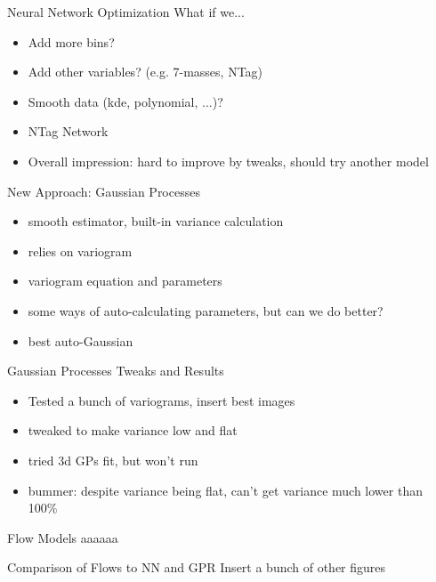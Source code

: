 \documentclass[10pt, aspectratio=169]{beamer}
\begin{document}
\begin{frame}{Neural Network Optimization}
  What if we...
  \begin{itemize}
    \item Add more bins?
    \item Add other variables? (e.g. 7-masses, NTag)
    \item Smooth data (kde, polynomial, ...)?
    \item NTag Network
    \item Overall impression: hard to improve by tweaks, should try another model
  \end{itemize}
\end{frame}

\begin{frame}{New Approach: Gaussian Processes}
  \begin{itemize}
    \item smooth estimator, built-in variance calculation
    \item relies on variogram
    \item variogram equation and parameters
    \item some ways of auto-calculating parameters, but can we do better?
    \item best auto-Gaussian
  \end{itemize}
\end{frame}

\begin{frame}{Gaussian Processes Tweaks and Results}
  \begin{itemize}
    \item Tested a bunch of variograms, insert best images
    \item tweaked to make variance low and flat
    \item tried 3d GPs fit, but won't run
    \item bummer: despite variance being flat, can't get variance much lower than 100\% 
  \end{itemize}
\end{frame}

\begin{frame}{Flow Models}
  aaaaaa
\end{frame}

\begin{frame}{Comparison of Flows to NN and GPR}
  Insert a bunch of other figures
\end{frame}
\end{document}
